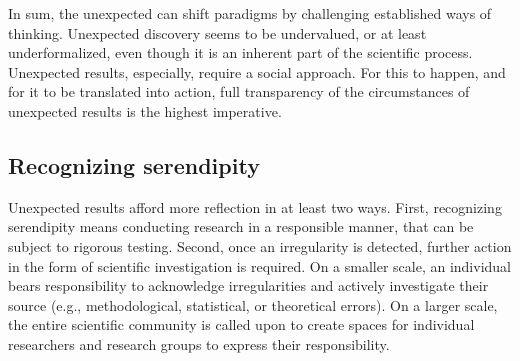 \documentclass[authordate, commentary]{jote-new-article}
\begin{document}
	In sum, the unexpected can shift paradigms by challenging established ways of thinking. Unexpected discovery seems to be undervalued, or at least underformalized, even though it is an inherent part of the scientific process. Unexpected results, especially, require a social approach. For this to happen, and for it to be translated into action, full transparency of the circumstances of unexpected results is the highest imperative.


	\subsection{Recognizing serendipity}



	Unexpected results afford more reflection in at least two ways. First, recognizing serendipity means conducting research in a responsible manner, that can be subject to rigorous testing. Second, once an irregularity is detected, further action in the form of scientific investigation is required. On a smaller scale, an individual bears responsibility to acknowledge irregularities and actively investigate their source (e.g., methodological, statistical, or theoretical errors). On a larger scale, the entire scientific community is called upon to create spaces for individual researchers and research groups to express their responsibility.
\end{document}
